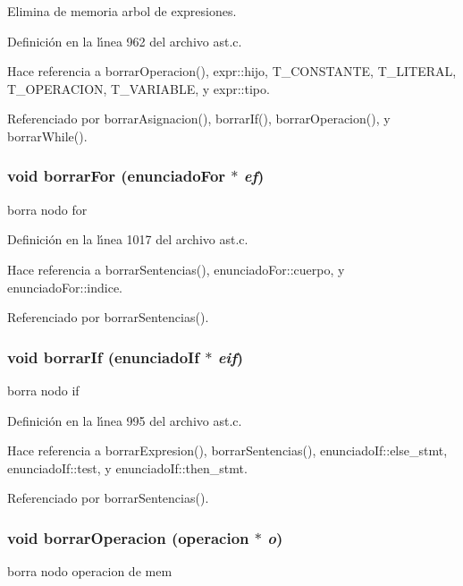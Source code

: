 Elimina de memoria arbol de expresiones. 



Definici\'{o}n en la l\'{\i}nea 962 del archivo ast.c.

Hace referencia a borrar\-Operacion(), expr::hijo, T\_\-CONSTANTE, T\_\-LITERAL, T\_\-OPERACION, T\_\-VARIABLE, y expr::tipo.

Referenciado por borrar\-Asignacion(), borrar\-If(), borrar\-Operacion(), y borrar\-While().
\subsubsection{\setlength{\rightskip}{0pt plus 5cm}void borrar\-For ({\bf enunciado\-For} $\ast$ {\em ef})}\label{ast_8c_a52}


borra nodo for 



Definici\'{o}n en la l\'{\i}nea 1017 del archivo ast.c.

Hace referencia a borrar\-Sentencias(), enunciado\-For::cuerpo, y enunciado\-For::indice.

Referenciado por borrar\-Sentencias().
\subsubsection{\setlength{\rightskip}{0pt plus 5cm}void borrar\-If ({\bf enunciado\-If} $\ast$ {\em eif})}\label{ast_8c_a50}


borra nodo if 



Definici\'{o}n en la l\'{\i}nea 995 del archivo ast.c.

Hace referencia a borrar\-Expresion(), borrar\-Sentencias(), enunciado\-If::else\_\-stmt, enunciado\-If::test, y enunciado\-If::then\_\-stmt.

Referenciado por borrar\-Sentencias().
\subsubsection{\setlength{\rightskip}{0pt plus 5cm}void borrar\-Operacion ({\bf operacion} $\ast$ {\em o})}\label{ast_8c_a49}


borra nodo operacion de mem 




